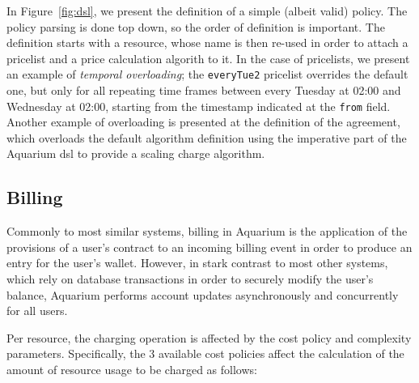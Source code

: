 \documentclass[preprint,10pt]{sigplanconf}
\begin{document}
In Figure~\ref{fig:dsl}, we present the definition of a simple (albeit valid) 
policy. The policy parsing is done top down, so the order of definition 
is important. The definition starts with a resource, whose name is then
re-used in order to attach a pricelist and a price calculation algorith to it.
In the case of pricelists, we present an example of \emph{temporal overloading};
the \texttt{everyTue2} pricelist overrides the default one, but only for 
all repeating time frames between every Tuesday at 02:00 and Wednesday at
02:00, starting from the timestamp indicated at the \texttt{from} field. Another
example of overloading is presented at the definition of the agreement, which
overloads the default algorithm definition using the imperative part of the
Aquarium {\sc dsl} to provide a scaling charge algorithm.

\subsection{Billing}

Commonly to most similar systems, billing in Aquarium is the application of the
provisions of a user's contract to an incoming billing event in order to
produce an entry for the user's wallet. However, in stark contrast to most
other systems, which rely on database transactions in order to securely modify
the user's balance, Aquarium performs account updates asynchronously and
concurrently for all users.



Per resource, the charging operation is affected by the cost policy and complexity
parameters. Specifically, the 3 available cost policies affect the calculation 
of the amount of resource usage to be charged as follows:
\end{document}
